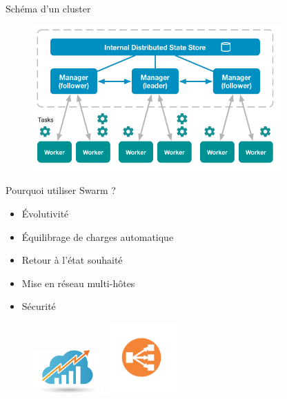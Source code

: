 \documentclass{cubeamer}
\begin{document}
\begin{frame}{Schéma d'un cluster}
    \begin{figure}
        \centering
        \includegraphics[width=0.85\textwidth]{img/swarm-network}
    \end{figure}
\end{frame}

\begin{frame}{Pourquoi utiliser Swarm ?}
    \begin{multicols}{2}
        \begin{itemize}
            \item Évolutivité
            \item Équilibrage de charges automatique
            \item Retour à l'état souhaité
            \item Mise en réseau multi-hôtes
            \item Sécurité
        \end{itemize}
    \columnbreak
        \begin{figure}
            \centering
            \includegraphics[width=0.24\textwidth]{img/scalability}
            \includegraphics[width=0.24\textwidth]{img/load-balancing}
        \end{figure}
    \end{multicols}
\end{frame}
\end{document}
